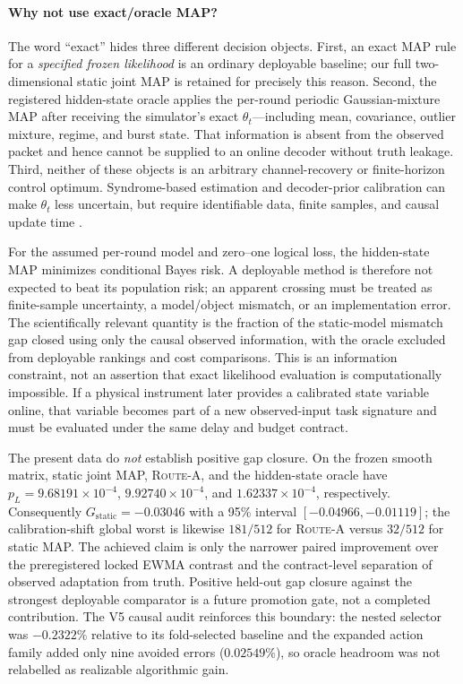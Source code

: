 \documentclass[11pt]{article}
\newcommand{\RouteA}{\textsc{Route-A}}
\begin{document}
\paragraph{Why not use exact/oracle MAP?}
The word ``exact'' hides three different decision objects.  First, an exact
MAP rule for a \emph{specified frozen likelihood} is an ordinary deployable
baseline; our full two-dimensional static joint MAP is retained for precisely
this reason.  Second, the registered hidden-state oracle applies the
per-round periodic Gaussian-mixture MAP after receiving the simulator's exact
$\theta_t$---including mean, covariance, outlier mixture, regime, and burst
state.  That information is absent from the observed packet and hence cannot
be supplied to an online decoder without truth leakage.  Third, neither of
these objects is an arbitrary channel-recovery or finite-horizon control
optimum.  Syndrome-based estimation and decoder-prior calibration can make
$\theta_t$ less uncertain, but require identifiable data, finite samples, and
causal update time \cite{spitz2018,wagner2021,sivak2024}.

For the assumed per-round model and zero--one logical loss, the hidden-state
MAP minimizes conditional Bayes risk.  A deployable method is therefore not
expected to beat its population risk; an apparent crossing must be treated as
finite-sample uncertainty, a model/object mismatch, or an implementation
error.  The scientifically relevant quantity is the fraction of the
static-model mismatch gap closed using only the causal observed information,
with the oracle excluded from deployable rankings and cost comparisons.  This
is an information constraint, not an assertion that exact likelihood
evaluation is computationally impossible.  If a physical instrument later
provides a calibrated state variable online, that variable becomes part of a
new observed-input task signature and must be evaluated under the same delay
and budget contract.

The present data do \emph{not} establish positive gap closure.  On the frozen
smooth matrix, static joint MAP, \RouteA{}, and the hidden-state oracle have
$p_L=9.68191\times10^{-4}$, $9.92740\times10^{-4}$, and
$1.62337\times10^{-4}$, respectively.  Consequently
$G_{\mathrm{static}}=-0.03046$ with a 95\% interval
$[-0.04966,-0.01119]$; the calibration-shift global worst is likewise
$181/512$ for \RouteA{} versus $32/512$ for static MAP.  The achieved claim
is only the narrower paired improvement over the preregistered locked EWMA
contrast and the contract-level separation of observed adaptation from truth.
Positive held-out gap closure against the strongest deployable comparator is
a future promotion gate, not a completed contribution.  The V5 causal audit
reinforces this boundary: the nested selector was $-0.2322\%$ relative to its
fold-selected baseline and the expanded action family added only nine avoided
errors ($0.02549\%$), so oracle headroom was not relabelled as realizable
algorithmic gain.
\end{document}
